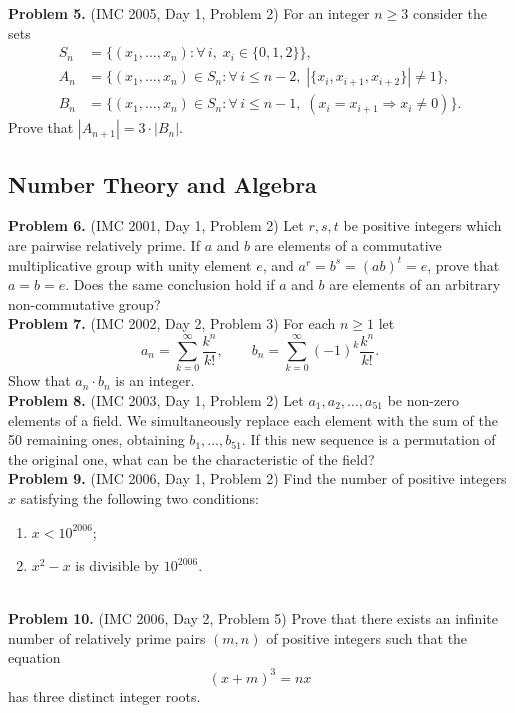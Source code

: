 \documentclass{article}
\begin{document}
\textbf{Problem 5.} (IMC 2005, Day 1, Problem 2)
For an integer \( n \geq 3 \) consider the sets
\begin{align*}
S_n &= \{(x_1, \ldots, x_n) : \forall\, i,\; x_i \in \{0,1,2\}\}, \\
A_n &= \{(x_1, \ldots, x_n) \in S_n : \forall\, i \leq n-2,\; |\{x_i, x_{i+1}, x_{i+2}\}| \neq 1\}, \\
B_n &= \{(x_1, \ldots, x_n) \in S_n : \forall\, i \leq n-1,\; (x_i = x_{i+1} \Rightarrow x_i \neq 0)\}.
\end{align*}
Prove that \( |A_{n+1}| = 3 \cdot |B_n| \).
\\

\subsection*{Number Theory and Algebra}

\textbf{Problem 6.} (IMC 2001, Day 1, Problem 2)
Let \( r, s, t \) be positive integers which are pairwise relatively prime. If \( a \) and \( b \) are elements of a commutative multiplicative group with unity element \( e \), and \( a^r = b^s = (ab)^t = e \), prove that \( a = b = e \). Does the same conclusion hold if \( a \) and \( b \) are elements of an arbitrary non-commutative group?
\\

\textbf{Problem 7.} (IMC 2002, Day 2, Problem 3)
For each \( n \geq 1 \) let
\[
a_n = \sum_{k=0}^{\infty} \frac{k^n}{k!}, \qquad b_n = \sum_{k=0}^{\infty} (-1)^k \frac{k^n}{k!}.
\]
Show that \( a_n \cdot b_n \) is an integer.
\\

\textbf{Problem 8.} (IMC 2003, Day 1, Problem 2)
Let \( a_1, a_2, \ldots, a_{51} \) be non-zero elements of a field. We simultaneously replace each element with the sum of the 50 remaining ones, obtaining \( b_1, \ldots, b_{51} \). If this new sequence is a permutation of the original one, what can be the characteristic of the field?
\\

\textbf{Problem 9.} (IMC 2006, Day 1, Problem 2)
Find the number of positive integers \( x \) satisfying the following two conditions:
\begin{enumerate}
    \item \( x < 10^{2006} \);
    \item \( x^2 - x \) is divisible by \( 10^{2006} \).
\end{enumerate}
\\

\textbf{Problem 10.} (IMC 2006, Day 2, Problem 5)
Prove that there exists an infinite number of relatively prime pairs \( (m, n) \) of positive integers such that the equation
\[
(x + m)^3 = nx
\]
has three distinct integer roots.
\end{document}
